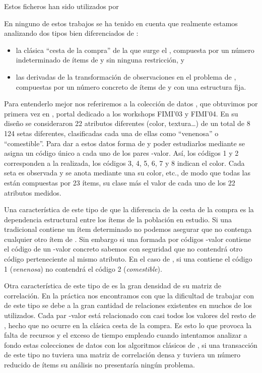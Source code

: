 Estos ficheros han sido utilizados por

En ninguno de estos trabajos se ha tenido en cuenta que realmente estamos analizando dos tipos bien diferenciados de \transacciones:
\begin{itemize}
  \item la clásica "`cesta de la compra"' de la que surge el \ARM, compuesta por un número indeterminado de ítems de \I y sin ninguna restricción, y
  \item las \transacciones derivadas de la transformación de observaciones en el problema de \Clasificacion, compuestas por un número concreto de ítems de \I y con una estructura fija.
\end{itemize}

Para entenderlo mejor nos referiremos a la colección de datos \mushroom, que obtuvimos por primera vez en , portal dedicado a los workshops FIMI'03 y FIMI'04. En su diseño se consideraron 22 atributos diferentes (color, textura\ldots) de un total de 8\,124 setas diferentes, clasificadas cada una de ellas como "`venenosa"' o "`comestible"'. Para dar a estos datos forma de \transaccion y poder estudiarlos mediante \ARM se asigna un código único a cada uno de los pares \atributo-valor. Así, los códigos 1 y 2 corresponden a la \clasificacion realizada, los códigos 3, 4, 5, 6, 7 y 8 indican el color. Cada seta es observada y se anota mediante una \transaccion su color, etc., de modo que todas las \transacciones están compuestas por 23 ítems, su clase más el valor de cada uno de los 22 atributos medidos.

Una característica de este tipo de \transaccion que la diferencia de la cesta de la compra es la dependencia estructural entre los ítems de la población en estudio. Si una \transaccion tradicional contiene un ítem determinado no podemos asegurar que no contenga cualquier otro ítem de \I. Sin embargo si una \transaccion formada por códigos \atributo-valor contiene el código de un \atributo-valor concreto sabemos con seguridad que no contendrá otro código perteneciente al mismo atributo. En el caso de \mushroom, si una \transaccion contiene el código 1 (\emph{venenosa}) no contendrá el código 2 (\emph{comestible}).

Otra característica de este tipo de \transacciones es la gran densidad de su matriz de correlación. En la práctica nos encontramos con que la dificultad de trabajar con \transacciones de este tipo se debe a la gran cantidad de relaciones existentes en muchos de los \datasets utilizados. Cada par \atributo-valor está relacionado con casi todos los valores del resto de \atributos, hecho que no ocurre en la clásica cesta de la compra. Es esto lo que provoca la falta de recursos y el exceso de tiempo empleado cuando intentamos analizar a fondo estas colecciones de datos con los algoritmos clásicos de \ARM, si una transacción de este tipo no tuviera una matriz de correlación densa y tuviera un número reducido de ítems su análisis no presentaría ningún problema.


